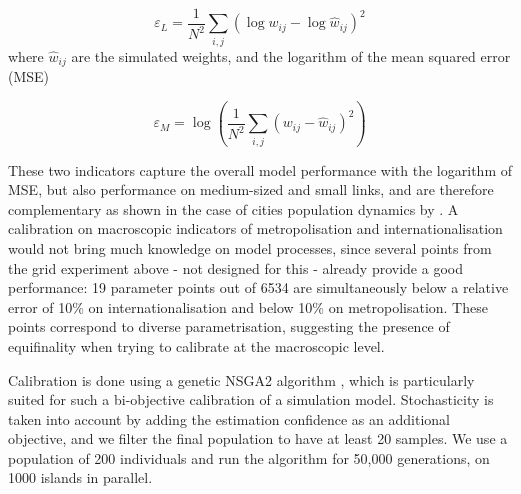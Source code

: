 \documentclass[10pt,letterpaper]{article}
\begin{document}
\begin{equation}
\varepsilon_L = \frac{1}{N^2} \sum_{i,j} \left(\log w_{ij} - \log \hat{w}_{ij} \right)^2
\end{equation}
where $\hat{w}_{ij}$ are the simulated weights, and the logarithm of the mean squared error (MSE)

\begin{equation}
\varepsilon_M = \log\left(\frac{1}{N^2} \sum_{i,j} \left(w_{ij} - \hat{w}_{ij}\right)^2 \right)
\end{equation}

These two indicators capture the overall model performance with the logarithm of MSE, but also performance on medium-sized and small links, and are therefore complementary as shown in the case of cities population dynamics by \cite{raimbault2018indirect}. A calibration on macroscopic indicators of metropolisation and internationalisation would not bring much knowledge on model processes, since several points from the grid experiment above - not designed for this - already provide a good performance: 19 parameter points out of 6534 are simultaneously below a relative error of 10\% on internationalisation and below 10\% on metropolisation. These points correspond to diverse parametrisation, suggesting the presence of equifinality when trying to calibrate at the macroscopic level. 

Calibration is done using a genetic NSGA2 algorithm \cite{deb2002fast}, which is particularly suited for such a bi-objective calibration of a simulation model. Stochasticity is taken into account by adding the estimation confidence as an additional objective, and we filter the final population to have at least 20 samples. We use a population of 200 individuals and run the algorithm for 50,000 generations, on 1000 islands in parallel.
\end{document}

